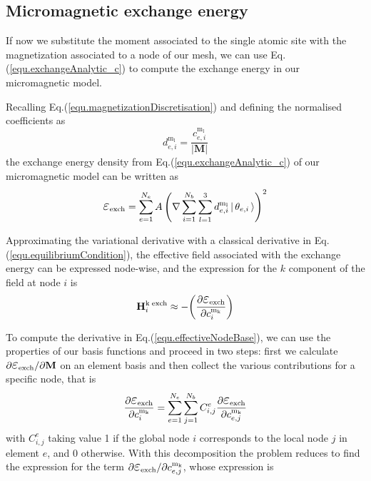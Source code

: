 \documentclass[11pt]{article}
\newcommand{\rv}[1]{\ensuremath{\mathbf{#1}}} %
\newcommand{\vc}[1]{\,|\,#1 \, \rangle}
\begin{document}
\subsection{Micromagnetic exchange energy}
If now we substitute the moment associated to the single atomic
site with the magnetization associated to a node of our mesh, we can
use Eq.(\ref{equ.exchangeAnalytic_c}) to compute the exchange energy
in our micromagnetic model. 

Recalling Eq.(\ref{equ.magnetizationDiscretisation}) and 
defining the normalised coefficients as 
\begin{equation}
d^\mathrm{m_l}_{e,i} = \frac{c^\mathrm{m_l}_{e,i}}{|\rv{M}|}
\label{equ.normalisedCoefficients}
\end{equation}
the exchange energy density from Eq.(\ref{equ.exchangeAnalytic_c}) of our
micromagnetic model can be written as  
\begin{equation}
\textrm{\Large{$\varepsilon$}\normalsize $_\mathrm{exch}$}
=  
\sum_{e=1}^{N_e} 
A \left( \nabla 
  \sum_{i=1}^{N_b} \sum_{l=1}^3 d^\mathrm{m_l}_{e,i}
  \vc{\theta_{e, i}} \right)^2  
\label{equ.micromagneticExchange}
\end{equation}

Approximating the variational derivative with a classical derivative
in Eq.(\ref{equ.equilibriumCondition}), the effective field associated
with the exchange energy can be expressed node-wise, 
and
the expression for the $k$ component of the field at node $i$ is
\begin{equation}
\rv{H}_i^\mathrm{k \; exch} \approx -\bigg( \frac{\partial
  \textrm{\Large{$\varepsilon$}\normalsize $_\mathrm{exch}$}}{\partial c^\mathrm{m_k}_{i}}\bigg)
\label{equ.effectiveNodeBase}
\end{equation}

To compute the derivative in Eq.(\ref{equ.effectiveNodeBase}), we
can use the properties of our basis functions and proceed in two steps:
first we calculate $\partial \textrm{\Large{$\varepsilon$}\normalsize
  $_\mathrm{exch}$} / \partial \rv{M}$ on an
element basis and then collect the various contributions for a
specific node, that is  
\begin{equation}
\frac{\partial \textrm{\Large{$\varepsilon$}\normalsize
    $_\mathrm{exch}$}} {\partial c^\mathrm{m_k}_{i}} 
=
\sum_{e=1}^{N_e} 
\sum_{j=1}^{N_b} 
C_{i,j}^e 
\frac{\partial \textrm{\Large{$\varepsilon$}\normalsize
    $_\mathrm{exch}$}} {\partial c^\mathrm{m_k}_{e,j}} 
\label{equ.effectiveLocalNodeBase}
\end{equation}
with $C_{i,j}^e$ taking value 1 if the global node $i$ corresponds to
the local node $j$ in element $e$, and 0 otherwise. With this
decomposition the problem reduces to find the expression for the term 
$\partial \textrm{\Large{$\varepsilon$}\normalsize $_\mathrm{exch}$} /
\partial c^\mathrm{m_k}_{e,j}$, whose expression is
\end{document}

